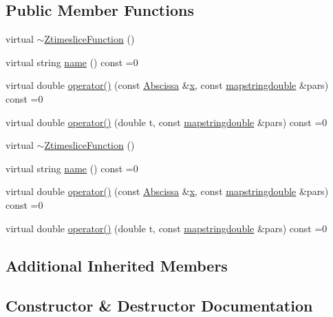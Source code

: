 \subsection*{Public Member Functions}
\begin{DoxyCompactItemize}
\item 
virtual \mbox{\hyperlink{classZtimesliceFunction_a7ca31c90f0865bd64d13476aac4cf67c}{$\sim$\+Ztimeslice\+Function}} ()
\item 
virtual string \mbox{\hyperlink{classZtimesliceFunction_a3c98a40a6155270bbb11d74c1b0f838c}{name}} () const =0
\item 
virtual double \mbox{\hyperlink{classZtimesliceFunction_ae7851ae590054311c69cdafc8f7ed621}{operator()}} (const \mbox{\hyperlink{classAbscissa}{Abscissa}} \&\mbox{\hyperlink{old__edb_8cc_a63584b830e7aaacb521b11b72291a4bc}{x}}, const \mbox{\hyperlink{lib_2fitting__lib_2includes_8h_a647b481c557c7966517f753340a81d13}{mapstringdouble}} \&pars) const =0
\item 
virtual double \mbox{\hyperlink{classZtimesliceFunction_aee3aaf0215deb7e33e609a3d227c28d5}{operator()}} (double t, const \mbox{\hyperlink{lib_2fitting__lib_2includes_8h_a647b481c557c7966517f753340a81d13}{mapstringdouble}} \&pars) const =0
\item 
virtual \mbox{\hyperlink{classZtimesliceFunction_a7ca31c90f0865bd64d13476aac4cf67c}{$\sim$\+Ztimeslice\+Function}} ()
\item 
virtual string \mbox{\hyperlink{classZtimesliceFunction_a3c98a40a6155270bbb11d74c1b0f838c}{name}} () const =0
\item 
virtual double \mbox{\hyperlink{classZtimesliceFunction_ae7851ae590054311c69cdafc8f7ed621}{operator()}} (const \mbox{\hyperlink{classAbscissa}{Abscissa}} \&\mbox{\hyperlink{old__edb_8cc_a63584b830e7aaacb521b11b72291a4bc}{x}}, const \mbox{\hyperlink{lib_2fitting__lib_2includes_8h_a647b481c557c7966517f753340a81d13}{mapstringdouble}} \&pars) const =0
\item 
virtual double \mbox{\hyperlink{classZtimesliceFunction_aee3aaf0215deb7e33e609a3d227c28d5}{operator()}} (double t, const \mbox{\hyperlink{lib_2fitting__lib_2includes_8h_a647b481c557c7966517f753340a81d13}{mapstringdouble}} \&pars) const =0
\end{DoxyCompactItemize}
\subsection*{Additional Inherited Members}


\subsection{Constructor \& Destructor Documentation}
\mbox{\label{classZtimesliceFunction_a7ca31c90f0865bd64d13476aac4cf67c}} 
